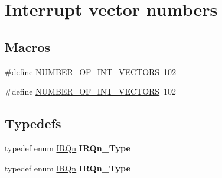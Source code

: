 \hypertarget{group__Interrupt__vector__numbers}{}\section{Interrupt vector numbers}
\label{group__Interrupt__vector__numbers}
\subsection*{Macros}
\begin{DoxyCompactItemize}
\item 
\#define \hyperlink{group__Interrupt__vector__numbers_gafe46d81f4fa2c4f6ed1361f24f046fa8}{N\+U\+M\+B\+E\+R\+\_\+\+O\+F\+\_\+\+I\+N\+T\+\_\+\+V\+E\+C\+T\+O\+RS}~102
\item 
\#define \hyperlink{group__Interrupt__vector__numbers_gafe46d81f4fa2c4f6ed1361f24f046fa8}{N\+U\+M\+B\+E\+R\+\_\+\+O\+F\+\_\+\+I\+N\+T\+\_\+\+V\+E\+C\+T\+O\+RS}~102
\end{DoxyCompactItemize}
\subsection*{Typedefs}
\begin{DoxyCompactItemize}
\item 
typedef enum \hyperlink{group__Interrupt__vector__numbers_ga666eb0caeb12ec0e281415592ae89083}{I\+R\+Qn} {\bfseries I\+R\+Qn\+\_\+\+Type}\hypertarget{group__Interrupt__vector__numbers_gac3af4a32370fb28c4ade8bf2add80251}{}\label{group__Interrupt__vector__numbers_gac3af4a32370fb28c4ade8bf2add80251}

\item 
typedef enum \hyperlink{group__Interrupt__vector__numbers_ga666eb0caeb12ec0e281415592ae89083}{I\+R\+Qn} {\bfseries I\+R\+Qn\+\_\+\+Type}\hypertarget{group__Interrupt__vector__numbers_gac3af4a32370fb28c4ade8bf2add80251}{}\label{group__Interrupt__vector__numbers_gac3af4a32370fb28c4ade8bf2add80251}

\end{DoxyCompactItemize}
